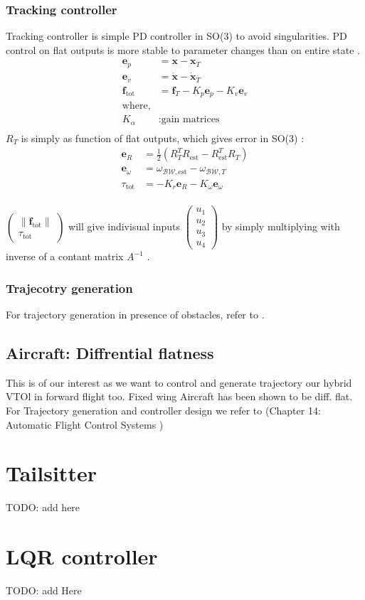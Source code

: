 \subsubsection{Tracking controller}
Tracking controller is simple PD controller in SO(3) to avoid singularities. PD control on flat outputs is more stable to parameter changes than on entire state \cite{Anintrod8:online}.
\begin{align*}
    \mathbf{e}_p &= \mathbf{x} - \mathbf{x}_T \\
    \mathbf{e}_v &= \mathbf{\dot{x}} - \mathbf{\dot{x}}_T \\
    \textbf{f}_\text{tot} &= \textbf{f}_T - K_p \mathbf{e}_p - K_v \mathbf{e}_v \\
    \text{where,} \\
    K_\alpha &: \text{gain matrices} \\
\end{align*}
$R_T$ is simply as function of flat outputs, which gives error in SO(3) \cite{bullo2004geometric}:
\begin{align*}
    \mathbf{e}_R &= \frac{1}{2} (R_T^T R_\text{est} - R_\text{est}^T R_T)\\
    \mathbf{e}_\omega &= \omega_{\mathcal{BW},\text{est}} - \omega_{\mathcal{BW},T}\\
    \tau_\text{tot} &= -K_r \mathbf{e}_R - K_\omega \mathbf{e}_\omega \\
\end{align*}

$\begin{pmatrix} \|\textbf{f}_\text{tot}\| \\ \tau_\text{tot} \end{pmatrix}$ will give indivisual inputs $\begin{pmatrix}u_1\\u_2\\u_3\\u_4\end{pmatrix}$ by simply multiplying with inverse of a contant matrix $A^{-1}$ \cite{mellinger2011minimum}.

\subsubsection{Trajecotry generation}

For trajectory generation in presence of obstacles, refer to \cite{mellinger2011minimum}.

\subsection{Aircraft: Diffrential flatness}
This is of our interest as we want to control and generate trajectory our hybrid VTOl in forward flight too. Fixed wing Aircraft has been shown to be diff. flat. For Trajectory generation and controller design we refer to (Chapter 14: Automatic Flight Control Systems \cite{levine2009analysis})

\section{Tailsitter}
TODO: add here

\section{LQR controller}
TODO: add Here
